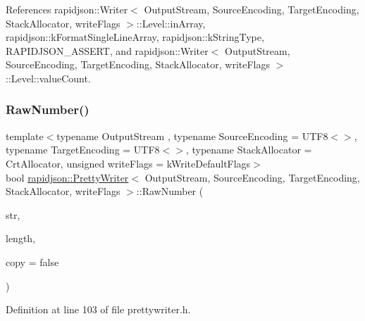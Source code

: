 References rapidjson\+::\+Writer$<$ Output\+Stream, Source\+Encoding, Target\+Encoding, Stack\+Allocator, write\+Flags $>$\+::\+Level\+::in\+Array, rapidjson\+::k\+Format\+Single\+Line\+Array, rapidjson\+::k\+String\+Type, R\+A\+P\+I\+D\+J\+S\+O\+N\+\_\+\+A\+S\+S\+E\+RT, and rapidjson\+::\+Writer$<$ Output\+Stream, Source\+Encoding, Target\+Encoding, Stack\+Allocator, write\+Flags $>$\+::\+Level\+::value\+Count.

\mbox{\label{classrapidjson_1_1_pretty_writer_a1189fbfd7e57207be1d5dc36d3d4b385}} 
\subsubsection{\texorpdfstring{RawNumber()}{RawNumber()}}
{\footnotesize\ttfamily template$<$typename Output\+Stream , typename Source\+Encoding  = U\+T\+F8$<$$>$, typename Target\+Encoding  = U\+T\+F8$<$$>$, typename Stack\+Allocator  = Crt\+Allocator, unsigned write\+Flags = k\+Write\+Default\+Flags$>$ \\
bool \mbox{\hyperlink{classrapidjson_1_1_pretty_writer}{rapidjson\+::\+Pretty\+Writer}}$<$ Output\+Stream, Source\+Encoding, Target\+Encoding, Stack\+Allocator, write\+Flags $>$\+::Raw\+Number (\begin{DoxyParamCaption}\item[{const \mbox{\hyperlink{classrapidjson_1_1_pretty_writer_a74a38902073aa599c8bcc6a3ca6126d0}{Ch}} $\ast$}]{str,  }\item[{\mbox{\hyperlink{namespacerapidjson_a44eb33eaa523e36d466b1ced64b85c84}{Size\+Type}}}]{length,  }\item[{bool}]{copy = {\ttfamily false} }\end{DoxyParamCaption})}



Definition at line 103 of file prettywriter.\+h.


